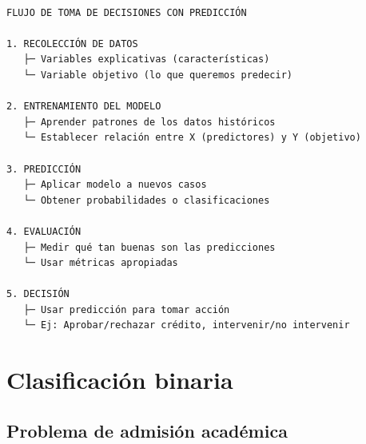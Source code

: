 \documentclass[
  doc,
  floatsintext,
  longtable,
  a4paper,
  nolmodern,
  notxfonts,
  notimes,
  12pt,
  colorlinks=true,linkcolor=blue,citecolor=blue,urlcolor=blue]{apa7}
\begin{document}
\begin{verbatim}

FLUJO DE TOMA DE DECISIONES CON PREDICCIÓN

1. RECOLECCIÓN DE DATOS
   ├─ Variables explicativas (características)
   └─ Variable objetivo (lo que queremos predecir)

2. ENTRENAMIENTO DEL MODELO
   ├─ Aprender patrones de los datos históricos
   └─ Establecer relación entre X (predictores) y Y (objetivo)

3. PREDICCIÓN
   ├─ Aplicar modelo a nuevos casos
   └─ Obtener probabilidades o clasificaciones

4. EVALUACIÓN
   ├─ Medir qué tan buenas son las predicciones
   └─ Usar métricas apropiadas

5. DECISIÓN
   ├─ Usar predicción para tomar acción
   └─ Ej: Aprobar/rechazar crédito, intervenir/no intervenir
\end{verbatim}

\section{Clasificación binaria}\label{clasificaciuxf3n-binaria}

\subsection{Problema de admisión
académica}\label{problema-de-admisiuxf3n-acaduxe9mica}
\end{document}
